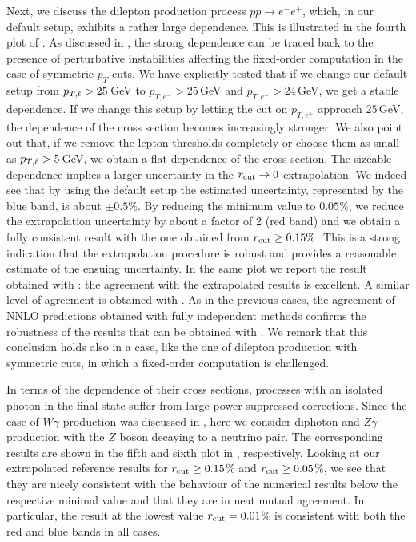 \documentclass[english,11pt]{article}
\begin{document}
Next, we discuss the dilepton production process $pp\rightarrow e^-e^+$, which, in our default setup,
exhibits a rather large \rcut{} dependence.
This is illustrated in the fourth plot of .
As discussed in , the strong \rcut{} dependence can be traced back to the presence
of perturbative instabilities \cite{Frixione:1997ks}
affecting the fixed-order computation in the case of symmetric $p_T$ cuts.
We have explicitly tested 
that if we change our default setup from $p_{T,\ell}>25$\,GeV to $p_{T,e^-}>25$\,GeV and $p_{T,e^+}>24$\,GeV, we get a stable 
\rcut{} dependence. If we change this setup by letting the cut on $p_{T,e^+}$ approach $25$\,GeV, the \rcut{} dependence of the cross section becomes 
increasingly stronger. We also point out that, if we remove the lepton \pt{} thresholds completely or choose them as small as $p_{T,\ell}>5$\,GeV, 
we obtain a flat \rcut{} dependence of the cross section.
The sizeable \rcut{} dependence implies a larger uncertainty in the $r_{\mathrm{cut}}\to 0$ extrapolation.
We indeed see that by using the default setup the estimated uncertainty, represented by the blue band, is about $\pm 0.5\%$. By reducing the minimum \rcut{} value to $0.05\%$,
we reduce the extrapolation uncertainty by about a factor of 2 (red band) and we obtain a fully consistent result with the one obtained from $r_{\mathrm{cut}}\geq 0.15\%$.
This is a strong indication that the extrapolation procedure is robust and provides a reasonable estimate of the ensuing uncertainty.
In the same plot we report the result obtained with \FEWZ{}: the agreement with the extrapolated results is excellent.
A similar level of agreement is obtained with \NNLOjet{}. As in the previous cases, the agreement of NNLO predictions obtained with fully independent methods
confirms the robustness of the results that can be obtained with \Matrix{}. We remark that this conclusion holds
also in a case, like the one of dilepton production with symmetric cuts,
in which a fixed-order computation is challenged.

\enlargethispage{\baselineskip}

In terms of the \rcut{} dependence of their cross sections, processes 
with an isolated photon in the final state suffer from large power-suppressed corrections.
Since the case of $W\gamma$ production was discussed in ,
here we consider diphoton and $Z\gamma$ production with the $Z$ boson decaying to a neutrino pair.
The corresponding results are shown in the fifth and sixth plot in ,
respectively.
Looking at our extrapolated reference results for $r_{\mathrm{cut}}{}\ge 0.15$\% and $r_{\mathrm{cut}}{}\ge 0.05$\%,
we see that
they are nicely consistent with the behaviour of the numerical results below the respective minimal \rcut{} value and that they are in neat 
mutual agreement.
In particular, the result at the lowest \rcut{} value $r_{\mathrm{cut}}{}=0.01$\% is consistent with both the red and blue bands in all cases. 
\end{document}
